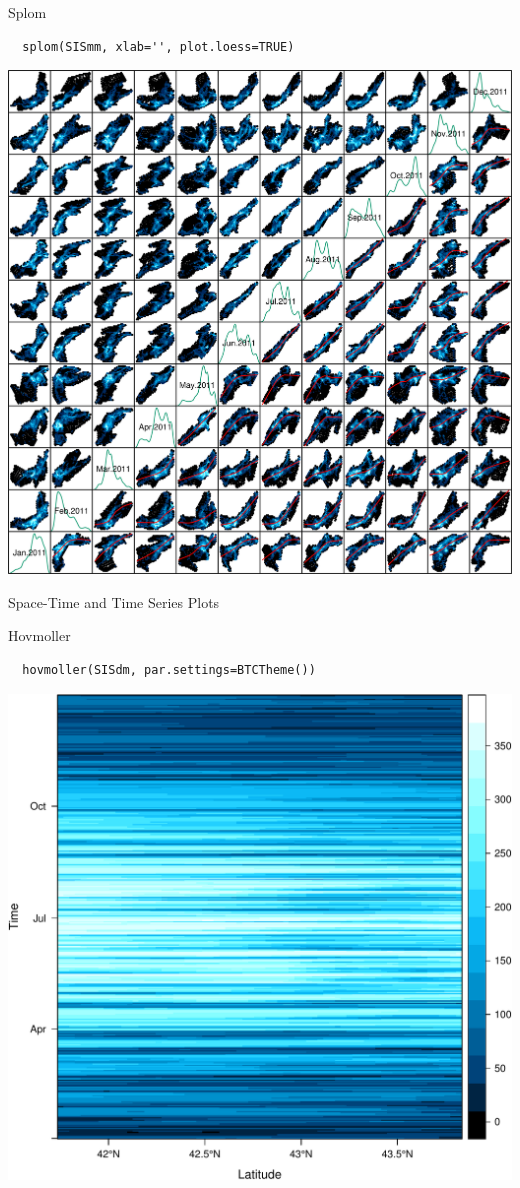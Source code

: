 \documentclass[xcolor={usenames,svgnames,dvipsnames}]{beamer}
\begin{document}
\begin{frame}[fragile,label=sec-4-9]{Splom}
 \lstset{language=R,label= ,caption= ,numbers=none}
\begin{lstlisting}
  splom(SISmm, xlab='', plot.loess=TRUE)
\end{lstlisting}

\includegraphics[width=.9\linewidth]{figs/SISmm_splom.png}
\end{frame}


\begin{frame}[label=sec-4-10]{Space-Time and Time Series Plots}
\end{frame}



\begin{frame}[fragile,label=sec-4-11]{Hovmoller}
 \lstset{language=R,label= ,caption= ,numbers=none}
\begin{lstlisting}
  hovmoller(SISdm, par.settings=BTCTheme())
\end{lstlisting}
\includegraphics[width=.9\linewidth]{figs/SISdm_hovmoller_lat.pdf}
\end{frame}
\end{document}
